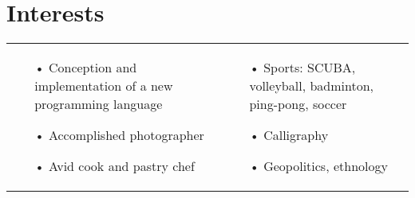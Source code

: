 \documentclass{cv}
\begin{document}
	\vspace{-0.5\baselineskip} %

	\section{Interests }
		\begin{tabu} [t] {@{} X[1,l]  X[1,l] @{} }
			\begin{itemize}
				\item[•] Conception and implementation of a new programming language
				\item[•] Accomplished photographer
				\item[•] Avid cook and pastry chef
			\end{itemize}
			&
			\begin{itemize}
				\item[•] Sports: SCUBA, volleyball, badminton, ping-pong, soccer
				\item[•] Calligraphy
				\item[•] Geopolitics, ethnology
			\end{itemize}
		\end{tabu}
\end{document}
